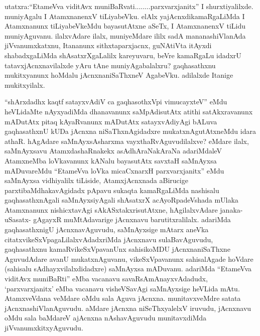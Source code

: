 
\begin{artha}
utatxra:\ndash  ``EtameVva viditAvx muniBaRvati........parxvarxjanitx'' I shurxtiyalilxde. muniyAgalu I AtamxnanenxV tiLiyabeVku. elAlx yajAcnxdikamaRgaLiMda I Atamxnanunx tiLiyabeVkeMdu bayasutAtxne aSeTx, I AtamxnanenxV tiLidu muniyAguvanu. ilalxvAdare ilalx, muniyeMdare ililx sadA mananashiVlanAda jiVvanumxkatxnu, Itananunx sithxtaparxjacnx, guNAtiVta itAyxdi shabadxgaLiMda shAsatxrXgaLalilx kareyuvaru, beVre kamaRgaLu idadxrU tatavxjAcnxnavilalxde yAru tAne muniyAgabalalxru? gaqhasathxnu mukitxyanunx hoMdalu jAcnxnaniSaThxneV AgabeVku. adilalxde Itanige mukitxyilalx.
\end{artha}


\begin{artha}
``shArxdadhx kaqtf satayxvAdiV ca gaqhasothxV\s pi vimucayxteV'' eMdu heVLidaMte nAyxyadiMda dhanavanunx saMpAdisutAtx atithi satAkxravanunx mADutAtx pitaq kAyaRvanunx mADutAtx satayxvAdiyAgi bALuva gaqhasathxnU kUDa jAcnxna niSaThxnAgidadxre mukatxnAgutAtxneMdu idara athaR. hAgAdare saMnAyxsAsharxma vayxthaRvAguvudilalxve? eMdare ilalx, saMnAyxsavu AtamxdashaRnakekx asAdhAraNakAraNa adariMdaleV AtamxneMba loVkavanunx kANalu bayasutAtx savxtaH saMnAyxsa mADuvareMdu ``EtameVva loVka micaCxnarxH parxvarxjanitx'' eMdu saMnAyxsa vidhiyalilx tiLiside, AtamxjAcnxnada aBirucige parxtibaMdhakavAgidadx pApavu sukaqta kamaRgaLiMda nashisalu gaqhasathxnAgali saMnAyxsiyAgali shAsatxrX acAyoRpadeVshada mUlaka Atamxnanunx nishicxtavAgi sAkASxtakxrisutAtxne, hAgilalxvAdare janaka- uSasatx- gAgayxR muMtAdavarige jAcnxnavu barutitxralilalx. adariMda gaqhasathxnigU jAcnxnavAguvudu, saMnAyxsige mAtarx aneVka citatxvikeSxVpagaLilalxvAdadxriMda jAcnxnavu sulaBavAguvudu, gaqhasathxnu kamaRvikeSxVpavanUnx sahisikoMDU jAcnxnaniSaThxne AguvudAdare avanU mukatxnAguvanu, vikeSxVpavanunx sahisalAgade hoVdare (sahisalu sAdhayxvilalxdidadxre) saMnAyxsa mADuvanu. adariMda ``EtameVva viditAvx muniBaRti'' eMba vacanavu savaRsAmAnayxvAdadudx, `parxvarxjanitx' eMba vacanavu visheVSavAgi saMnAyxsige heVLida mAtu. AtamxveVdana veMdare oMdu sala Aguva jAcnxna. munitavxveMdre satata jAcnxnashiVlanAguvudu. aMdare jAcnxna niSeThxyalelxV iruvudu, jAcnxnavu oMdu sala baMdareV ajAcnxna nAshavAguvudu munitavxdiMda jiVvanumxkitxyAguvudu.
\end{artha}

